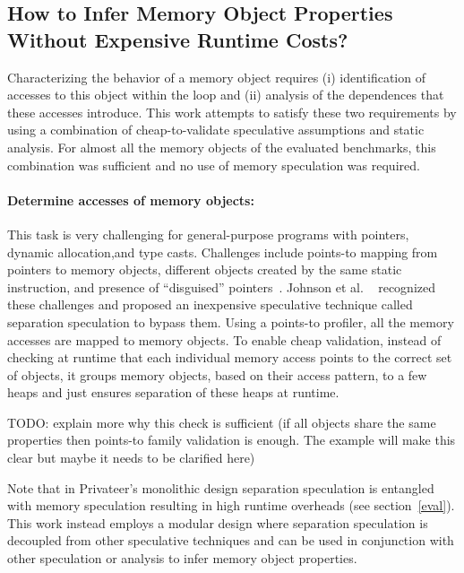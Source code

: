\subsection{How to Infer Memory Object Properties \\ Without Expensive Runtime
Costs?}

Characterizing the behavior of a memory object requires (i) identification of
accesses to this object within the loop and (ii) analysis of the dependences
that these accesses introduce.  This work attempts to satisfy these two
requirements by using a combination of cheap-to-validate speculative assumptions
and static analysis. For almost all the memory objects of the evaluated
benchmarks, this combination was sufficient and no use of memory speculation was
required.

\paragraph{Determine accesses of memory objects:} This task is very challenging
for general-purpose programs with pointers, dynamic allocation,and type casts.
%
Challenges include points-to mapping from pointers to memory objects, different
objects created by the same static instruction, and presence of ``disguised''
pointers~\cite{citation3_from_privateer}.
%
Johnson et al. ~\cite{johnson:pldi:12} recognized these challenges and proposed
an inexpensive speculative technique called separation speculation to bypass
them.
%
Using a points-to profiler, all the memory accesses are mapped to memory
objects.
%
To enable cheap validation, instead of checking at runtime that each individual
memory access points to the correct set of objects, it groups memory objects,
based on their access pattern, to a few heaps and just ensures separation of
these heaps at runtime.
%

TODO: explain more why this check is sufficient (if all objects share the same
properties then points-to family validation is enough. The example will make
this clear but maybe it needs to be clarified here)

%
%
Note that in Privateer's monolithic design separation speculation is entangled
with memory speculation resulting in high runtime overheads (see
section~\ref{eval}).
%
This work instead employs a modular design where separation speculation is
decoupled from other speculative techniques and can be used in conjunction with
other speculation or analysis to infer memory object properties.

